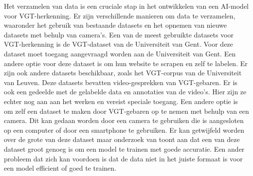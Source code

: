 Het verzamelen van data is een cruciale stap in het ontwikkelen van een AI-model voor VGT-herkenning.
Er zijn verschillende manieren om data te verzamelen, waaronder het gebruik van bestaande datasets en het opnemen van nieuwe datasets met behulp van camera's.
Een van de meest gebruikte datasets voor VGT-herkenning is de VGT-dataset van de Universiteit van Gent\autocite{VGT_Signbank}.
Voor deze dataset moet toegang aangevraagd worden aan de Universiteit van Gent.
Een andere optie voor deze dataset is om hun website te scrapen en zelf te labelen.
Er zijn ook andere datasets beschikbaar, zoals het VGT-corpus van de Universiteit van Leuven\textcite{Corpus_VGT}.
Deze datasets bevatten video-gesprekken van VGT-gebaren.
Er is ook een gedeelde met de gelabelde data en annotaties van de video's.
Hier zijn ze echter nog aan aan het werken en vereist speciale toegang\autocite{Over_het_Corpus_VGT}.
Een andere optie is om zelf een dataset te maken door VGT-gebaren op te nemen met behulp van een camera.
Dit kan gedaan worden door een camera te gebruiken die is aangesloten op een computer of door een smartphone te gebruiken.
Er kan getwijfeld worden over de grote van deze dataset maar onderzoek van \textcite{Coster2023} toont aan dat een van deze dataset groot genoeg is om een model te trainen met goede accuratie.
Een ander probleem dat zich kan voordoen is dat de data niet in het juiste formaat is voor een model efficient of goed te trainen\autocite{Vandeghinste2024}.


